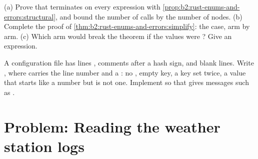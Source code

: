 \begin{exercise}[$\star\star\star$]\label{exo:b2:rust-enums-and-errors:11}
(a) Prove that  terminates on every expression with \cref{prop:b2:rust-enums-and-errors:structural}, and
bound the number of calls by the number of nodes. (b) Complete the proof of
\cref{thm:b2:rust-enums-and-errors:simplify}: the  case, arm by arm. (c) Which arm would break the theorem
if the values were ? Give an expression.
\end{exercise}

\begin{exercise}[$\star\star\star$]\label{exo:b2:rust-enums-and-errors:12}
A configuration file has lines , comments after a hash sign, and blank lines. Write
, where  carries the line number
and a : no \code{=}, empty key, a key set twice, a value that starts like a number but is not one. Implement
 so that  gives messages such as .
\end{exercise}

\section{Problem: Reading the weather station logs}\label{sec:b2:rust-enums-and-errors:problem}

